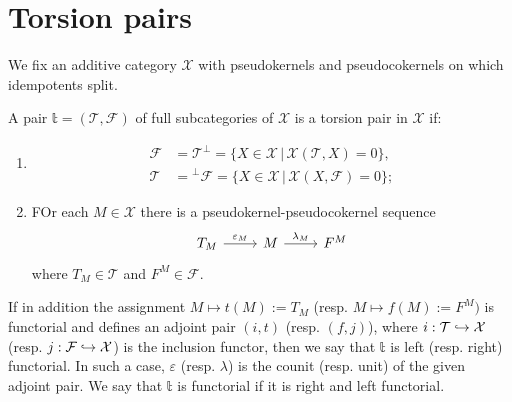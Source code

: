 \clearpage

\section{Torsion pairs}

We fix an additive category $\mathcal{X}$ with pseudokernels and pseudocokernels
on which idempotents split.

\begin{definition}
  A pair $\mathbb{t}=(\mathcal{T},\mathcal{F})$ of full subcategories of $\mathcal{X}$
  is a torsion pair in $\mathcal{X}$ if:
  \begin{enumerate}
    \item
    \begin{align*}
      \mathcal{F}&=\mathcal{T}^\perp = \{X\in\mathcal{X}\,|\,\mathcal{X}(\mathcal{T},X)=0\},\\
      \mathcal{T}&={^\perp\mathcal{F}} = \{X\in\mathcal{X}\,|\,\mathcal{X}(X,\mathcal{F})=0\};
    \end{align*}
    \item FOr each $M\in\mathcal{X}$ there is a pseudokernel-pseudocokernel sequence
    \begin{equation*}
      \begin{tikzcd}
        T_M\arrow{r}{\varepsilon_M}& M\arrow{r}{\lambda_M}&F^M
      \end{tikzcd}
    \end{equation*}
    where $T_M\in\mathcal{T}$ and $F^M\in\mathcal{F}$.
  \end{enumerate}

  If in addition the assignment $M\mapsto t(M) :=T_M$ (resp. $M\mapsto f(M):=F^M)$ is
  functorial and defines an adjoint pair $(i,t)$ (resp. $(f,j)$), where $i:\mathcal{T}\hookrightarrow \mathcal{X}$
  (resp. $j:\mathcal{F}\hookrightarrow \mathcal{X}$) is the inclusion functor, then we say that
  $\mathbb{t}$ is left (resp. right) functorial. In such a case,
  $\varepsilon$ (resp. $\lambda$) is the counit (resp. unit) of the given adjoint pair. We say
  that $\mathbb{t}$ is functorial if it is right and left functorial.
\end{definition}

